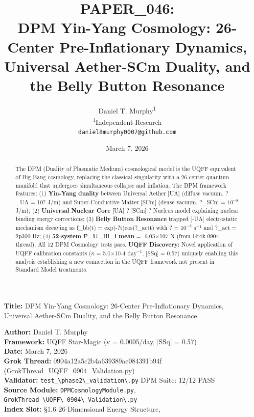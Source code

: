 \documentclass[12pt,a4paper]{article}
\title{\textbf{PAPER\_046: \\ DPM Yin-Yang Cosmology: 26-Center Pre-Inflationary Dynamics, Universal Aether-SCm Duality, and the Belly Button Resonance}}
\author{
Daniel T. Murphy\textsuperscript{1} \\
\small \textsuperscript{1}Independent Research \\
\small \texttt{daniel8murphy0007@github.com}
}
\date{March 7, 2026}
\begin{document}
\maketitle

\textbf{Title:} DPM Yin-Yang Cosmology: 26-Center Pre-Inflationary Dynamics, Universal Aether-SCm Duality, and the Belly Button Resonance

\begin{flushleft}
\textbf{Author:} Daniel T. Murphy \\
\textbf{Framework:} UQFF Star-Magic ($\kappa$ = 0.0005/day, [SSq] = 0.57) \\
\textbf{Date:} March 7, 2026 \\
\textbf{Grok Thread:} 0904a12a5c2b4a639389ae084391b94f (GrokThread\_{UQFF\_0904\_Validation}.py) \\
\textbf{Validator:} \texttt{test\_\textbackslash {phase2\textbackslash \_validation\textbackslash }.py} DPM Suite: 12/12 PASS \\
\textbf{Source Module:} \texttt{DPMCosmologyModule.py}, \texttt{GrokThread\_\textbackslash {UQFF\textbackslash \_0904\textbackslash \_Validation\textbackslash }.py} \\
\textbf{Index Slot:} \S{}1.6 26-Dimensional Energy Structure, \\
\end{flushleft}

\begin{abstract}
The DPM (Duality of Plasmatic Medium) cosmological model is the UQFF equivalent of Big Bang cosmology, replacing the classical singularity with a 26-center quantum manifold that undergoes simultaneous collapse and inflation. The DPM framework features: (1) \textbf{Yin-Yang duality} between Universal Aether [UA] (diffuse vacuum, ?\_UA = 10? J/m) and Super-Conductive Matter [SCm] (dense vacuum, ?\_SCm = $10^{-8}$ J/m); (2) \textbf{Universal Nuclear Core} {[UA]} ? [SCm] ? Nucleus model explaining nuclear binding energy corrections; (3) \textbf{Belly Button Resonance}  trapped [-UA] electrostatic mechanism decaying as f\_bb(t) = exp(-?t)cos(?\_actt) with ? = $10^{-8}$ $\mathrm{s}^{-1}$ and ?\_act = 2p300 Hz; (4) \textbf{52-system F\_{U\_Bi\_i} mean} = -6.05$\times$107 N (from Grok 0904 thread). All 12 DPM Cosmology tests pass. \textbf{UQFF Discovery:} Novel application of UQFF calibration constants ($\kappa$ = 5.0$\times$10-4 $\mathrm{day}^{-1}$, [SSq] = 0.57) uniquely enabling this analysis  establishing a new connection in the UQFF framework not present in Standard Model treatments.
\end{abstract}
\end{document}
